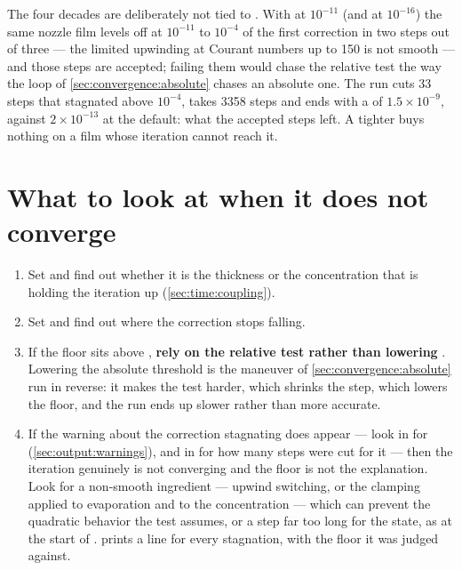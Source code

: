 The four decades are deliberately not tied to . With
 at $10^{-11}$ (and  at $10^{-16}$) the same nozzle film levels off at
$10^{-11}$ to $10^{-4}$ of the first correction in two steps out of three ---
the limited upwinding at Courant numbers up to 150 is not smooth --- and
those steps are accepted; failing them would chase the relative test the way
the loop of \cref{sec:convergence:absolute} chases an absolute one. The run
cuts 33 steps that stagnated above $10^{-4}$, takes 3358 steps and ends
with a  of $1.5\times10^{-9}$, against $2\times10^{-13}$ at
the default: what the accepted steps left. A tighter 
buys nothing on a film whose iteration cannot reach it.

\section{What to look at when it does not converge}
\label{sec:convergence:diagnosis}

\begin{enumerate}
  \item Set  and find out whether it is the
    thickness or the concentration that is holding the iteration up
    (\cref{sec:time:coupling}).
  \item Set  and find out where the correction stops
    falling.
  \item If the floor sits above , \textbf{rely on the relative
    test rather than lowering }. Lowering the absolute threshold
    is the maneuver of \cref{sec:convergence:absolute} run in reverse: it
    makes the test harder, which shrinks the step, which lowers the floor, and
    the run ends up slower rather than more accurate.
  \item If the warning about the correction stagnating does appear --- look in
     for 
    (\cref{sec:output:warnings}), and in  for how many
    steps were cut for it ---
    then the iteration genuinely is not converging and the floor is not the
    explanation. Look for a non-smooth ingredient --- upwind switching, or the
    clamping applied to evaporation and to the concentration --- which can
    prevent the quadratic behavior the test assumes, or a step far too long
    for the state, as at the start of .
     prints a line for every stagnation, with
    the floor it was judged against.
\end{enumerate}

